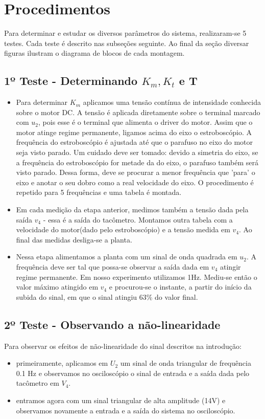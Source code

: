 \section{Procedimentos}
Para determinar e estudar os diversos parâmetros do sistema, realizaram-se 5 testes. Cada teste é descrito nas subseções seguinte. Ao final da seção diversar figuras ilustram o diagrama de blocos de cada montagem.

\subsection{1º Teste - Determinando \texorpdfstring{$K_m, K_t$ e T}{Lg}}

\begin{itemize}
	\item Para determinar $K_m$ aplicamos uma tensão contínua de intensidade conhecida sobre o motor DC. A tensão é aplicada diretamente sobre o terminal marcado com $u_2$, pois esse é o terminal que alimenta o driver do motor. Assim que o motor atinge regime permanente, ligamos acima do eixo o estroboscópio. A frequência do estroboscópio é ajustada até que o parafuso no eixo do motor seja visto parado. Um cuidado deve ser tomado: devido a simetria do eixo, se a frequência do estroboscópio for metade da do eixo, o parafuso também será visto parado. Dessa forma, deve se procurar a menor frequência que 'para' o eixo e anotar o seu dobro como a real velocidade do eixo. O procedimento é repetido para 5 frequências e uma tabela é montada.
    
    \item
    	Em cada medição da etapa anterior, medimos também a tensão dada pela saída $v_4$ - essa é a saída do tacômetro. Montamos outra tabela com a velocidade do motor(dado pelo estroboscópio) e a tensão medida em $v_4$. Ao final das medidas desliga-se a planta.
    
    \item Nessa etapa alimentamos a planta com um sinal de onda quadrada em $u_2$. A frequência deve ser tal que possa-se observar a saída dada em $v_4$ atingir regime permanente. Em nosso experimento utilizamos 1Hz. Mediu-se então o valor máximo atingido em $v_4$ e procurou-se o instante, a partir do início da subida do sinal, em que o sinal atingiu 63\% do valor final.  
\end{itemize}

\subsection{2º Teste - Observando a não-linearidade}
Para observar os efeitos de não-linearidade do sinal descritos na introdução:
\begin{itemize}
\item primeiramente, aplicamos em $U_2$ um sinal de onda triangular de frequência 0.1 Hz e observamos no osciloscópio o sinal de entrada e a saída dada pelo tacômetro em $V_4$.

\item entramos agora com um sinal triangular de alta amplitude (14V) e observamos novamente a entrada e a saída do sistema no osciloscópio.
\end{itemize}


